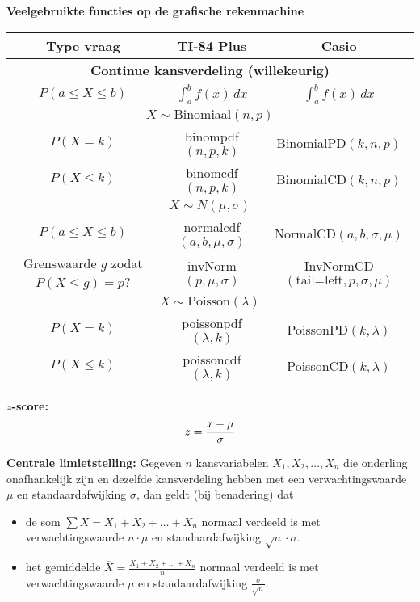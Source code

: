 \textbf{Veelgebruikte functies op de grafische rekenmachine}
\begin{table}[H]
    \centering
    \begin{tabular}{c|c|c}
        \toprule
            \textbf{Type vraag}                     & \textbf{TI-84 Plus}           & \textbf{Casio} \\
        \midrule
            \multicolumn{3}{c}{\textbf{Continue kansverdeling (willekeurig)}} \\ 
        \midrule
            $P(a \le X \le b)$                      & $\int_{a}^{b} f(x)\, dx$      & $\int_{a}^{b} f(x)\, dx$\\
        \midrule    
            \multicolumn{3}{c}{\textbf{$X \sim \text{Binomiaal}(n, p)$}} \\ 
        \midrule
            $P(X = k)$                              & binompdf$(n,p,k)$             & BinomialPD$(k, n, p)$ \\
            $P(X \le k)$                            & binomcdf$(n,p,k)$             & BinomialCD$(k, n, p)$ \\
        \midrule    
            \multicolumn{3}{c}{\textbf{$X \sim N(\mu, \sigma)$}} \\
        \midrule 
            $P(a \le X \le b)$                      & normalcdf$(a,b,\mu,\sigma)$   & NormalCD$(a, b, \sigma, \mu)$ \\
            Grenswaarde $g$ zodat $P(X \le g)=p$?   & invNorm$(p,\mu,\sigma)$       & InvNormCD$(\text{tail=left}, p, \sigma, \mu)$ \\
        \midrule 
            \multicolumn{3}{c}{\textbf{$X \sim \text{Poisson}(\lambda)$}} \\  
        \midrule
            $P(X = k)$                              & poissonpdf$(\lambda, k)$      & PoissonPD$(k, \lambda)$ \\
            $P(X \le k)$                            & poissoncdf$(\lambda, k)$      & PoissonCD$(k, \lambda)$ \\
        \bottomrule
    \end{tabular}
\end{table}

\textbf{$z$-score:}
\[
    z = \frac{x - \mu}{\sigma}\\
\]

\textbf{Centrale limietstelling:}
Gegeven $n$ kansvariabelen $X_1, X_2, \ldots, X_n$ die onderling onafhankelijk zijn en dezelfde kansverdeling hebben met een verwachtingswaarde $\mu$ en standaardafwijking $\sigma$, dan geldt (bij benadering) dat
\begin{itemize}
    \item de som $\sum X = X_1 + X_2 + \ldots + X_n$ normaal verdeeld is met verwachtingswaarde $n \cdot \mu$ en standaardafwijking $\sqrt{n} \cdot \sigma$.
    \item het gemiddelde $\overline{X} = \frac{X_1 + X_2 + \ldots + X_n}{n}$ normaal verdeeld is met verwachtingswaarde $\mu$ en standaardafwijking $\frac{\sigma}{\sqrt{n}}$.
\end{itemize}

